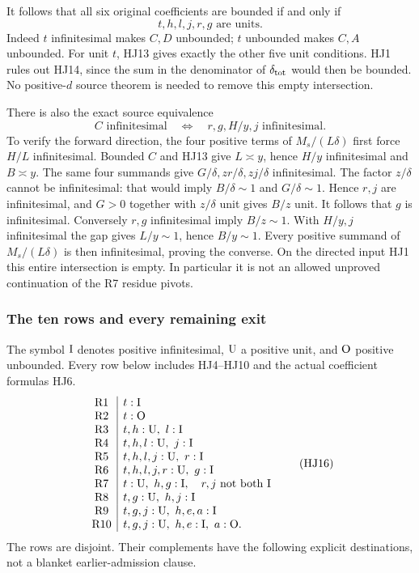 It follows that all six original coefficients are bounded
if and only if
\[
             t,h,l,j,r,g\text{ are units}.
 \tag{HJ14}
\]
Indeed \(t\) infinitesimal makes \(C,D\) unbounded;
\(t\) unbounded makes \(C,A\) unbounded.
For unit \(t\), HJ13 gives exactly the other five
unit conditions.  HJ1 rules out HJ14, since the
sum in the denominator of \(\delta_{\rm tot}\)
would then be bounded.  No positive-\(d\) source
theorem is needed to remove this empty intersection.

There is also the exact source equivalence
\[
 C\text{ infinitesimal}
 \quad\Longleftrightarrow\quad
 r,g,H/y,j\text{ infinitesimal}.
 \tag{HJ15}
\]
To verify the forward direction, the four positive
terms of \(M_s/(L\delta)\) first force \(H/L\)
infinitesimal.  Bounded \(C\) and HJ13 give
\(L\asymp y\), hence \(H/y\) infinitesimal and
\(B\asymp y\).  The same four summands give
\(G/\delta,zr/\delta,zj/\delta\) infinitesimal.
The factor \(z/\delta\) cannot be infinitesimal:
that would imply \(B/\delta\sim1\) and
\(G/\delta\sim1\).  Hence \(r,j\) are infinitesimal,
and \(G>0\) together with \(z/\delta\) unit gives
\(B/z\) unit.  It follows that \(g\) is infinitesimal.
Conversely \(r,g\) infinitesimal imply \(B/z\sim1\).
With \(H/y,j\) infinitesimal the gap gives
\(L/y\sim1\), hence \(B/y\sim1\).
Every positive summand of \(M_s/(L\delta)\) is then
infinitesimal, proving the converse.
On the directed input HJ1 this entire intersection
is empty.  In particular it is not an allowed
unproved continuation of the R7 residue pivots.

\subsubsection*{The ten rows and every remaining exit}

The symbol \({\rm I}\) denotes positive infinitesimal,
\({\rm U}\) a positive unit, and \({\rm O}\) positive
unbounded.  Every row below includes HJ4--HJ10 and
the actual coefficient formulas HJ6.
\[
\begin{array}{c|l}
 {\rm R1}&t:{\rm I}\\
 {\rm R2}&t:{\rm O}\\
 {\rm R3}&t,h:{\rm U},\ l:{\rm I}\\
 {\rm R4}&t,h,l:{\rm U},\ j:{\rm I}\\
 {\rm R5}&t,h,l,j:{\rm U},\ r:{\rm I}\\
 {\rm R6}&t,h,l,j,r:{\rm U},\ g:{\rm I}\\
 {\rm R7}&t:{\rm U},\ h,g:{\rm I},
                  \quad r,j\text{ not both }{\rm I}\\
 {\rm R8}&t,g:{\rm U},\ h,j:{\rm I}\\
 {\rm R9}&t,g,j:{\rm U},\ h,e,a:{\rm I}\\
 {\rm R10}&t,g,j:{\rm U},\ h,e:{\rm I},\ a:{\rm O}.
\end{array}
\tag{HJ16}
\]
The rows are disjoint.  Their complements have the
following explicit destinations, not a blanket
earlier-admission clause.

